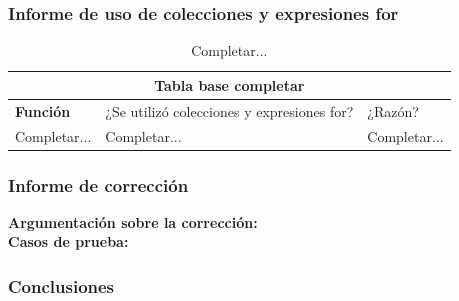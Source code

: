 \documentclass[12pt, a4paper]{article}
\begin{document}
\subsubsection{Informe de uso de colecciones y expresiones for}
\begin{table}[H]
    \scriptsize
   \begin{tabular}{ |p{4cm}|p{3cm}|p{5.5cm}|  }
    \hline
    \multicolumn{3}{|c|}{Tabla base completar} \\
    \hline
    \textbf{Función}& ¿Se utilizó colecciones y expresiones for?  & ¿Razón?\\
    \hline
     Completar... & Completar... &  Completar... \\
     \hline
   \end{tabular}
   \centering
   \caption{Completar...}
   \end{table}
\subsubsection{Informe de corrección}
\textbf{Argumentación sobre la corrección: \\}
\textbf{Casos de prueba: \\}
\subsubsection{Conclusiones}
\end{document}
